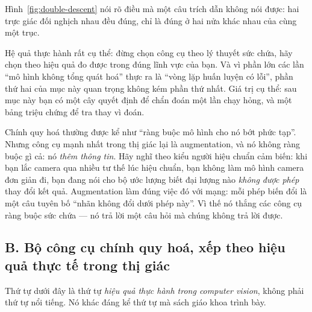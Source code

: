 \documentclass[../../../deep_learning.tex]{subfiles}
\begin{document}
Hình~\ref{fig:double-descent} nói rõ điều mà một câu trích dẫn không nói được: hai trực giác đối nghịch nhau đều đúng, chỉ là đúng ở hai nửa khác nhau của cùng một trục.

Hệ quả thực hành rất cụ thể: đừng chọn công cụ theo lý thuyết sức chứa, hãy chọn theo hiệu quả đo được trong đúng lĩnh vực của bạn. Và vì phần lớn các lần ``mô hình không tổng quát hoá'' thực ra là ``vòng lặp huấn luyện có lỗi'', phần thứ hai của mục này quan trọng không kém phần thứ nhất. Giá trị cụ thể: sau mục này bạn có một cây quyết định để chẩn đoán một lần chạy hỏng, và một bảng triệu chứng để tra thay vì đoán.

\begin{trucgiac}
Chính quy hoá thường được kể như ``ràng buộc mô hình cho nó bớt phức tạp''. Nhưng công cụ mạnh nhất trong thị giác lại là augmentation, và nó không ràng buộc gì cả: nó \emph{thêm thông tin}. Hãy nghĩ theo kiểu người hiệu chuẩn cảm biến: khi bạn lắc camera qua nhiều tư thế lúc hiệu chuẩn, bạn không làm mô hình camera đơn giản đi, bạn đang nói cho bộ ước lượng biết đại lượng nào \emph{không được phép} thay đổi kết quả. Augmentation làm đúng việc đó với mạng: mỗi phép biến đổi là một câu tuyên bố ``nhãn không đổi dưới phép này''. Vì thế nó thắng các công cụ ràng buộc sức chứa --- nó trả lời một câu hỏi mà chúng không trả lời được.
\end{trucgiac}

\subsection{B. Bộ công cụ chính quy hoá, xếp theo hiệu quả thực tế trong thị giác}
Thứ tự dưới đây là thứ tự \emph{hiệu quả thực hành trong computer vision}, không phải thứ tự nổi tiếng. Nó khác đáng kể thứ tự mà sách giáo khoa trình bày.
\end{document}
